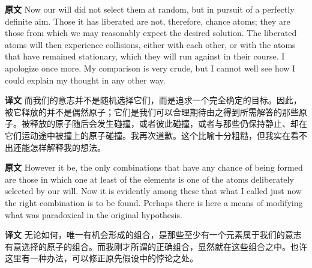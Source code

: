 \documentclass[UTF8]{ctexart}
\newenvironment{english}{\par\small\noindent\textbf{原文}\quad\ignorespaces}{\par}
\newenvironment{zhtranslation}{\par\noindent\textbf{译文}\quad\ignorespaces}{\par\vspace{0.35em}}
\begin{document}
\begin{english}
Now our will did not select them at random, but in pursuit of a perfectly definite aim. Those it has liberated are not, therefore, chance atoms; they are those from which we may reasonably expect the desired solution. The liberated atoms will then experience collisions, either with each other, or with the atoms that have remained stationary, which they will run against in their course. I apologize once more. My comparison is very crude, but I cannot well see how I could explain my thought in any other way.
\end{english}
\begin{zhtranslation}
而我们的意志并不是随机选择它们，而是追求一个完全确定的目标。因此，被它释放的并不是偶然原子；它们是我们可以合理期待由之得到所需解答的那些原子。被释放的原子随后会发生碰撞，或者彼此碰撞，或者与那些仍保持静止、却在它们运动途中被撞上的原子碰撞。我再次道歉。这个比喻十分粗糙，但我实在看不出还能怎样解释我的想法。\end{zhtranslation}

\begin{english}
However it be, the only combinations that have any chance of being formed are those in which one at least of the elements is one of the atoms deliberately selected by our will. Now it is evidently among these that what I called just now the right combination is to be found. Perhaps there is here a means of modifying what was paradoxical in the original hypothesis.
\end{english}
\begin{zhtranslation}
无论如何，唯一有机会形成的组合，是那些至少有一个元素属于我们的意志有意选择的原子的组合。而我刚才所谓的正确组合，显然就在这些组合之中。也许这里有一种办法，可以修正原先假设中的悖论之处。\end{zhtranslation}
\end{document}
